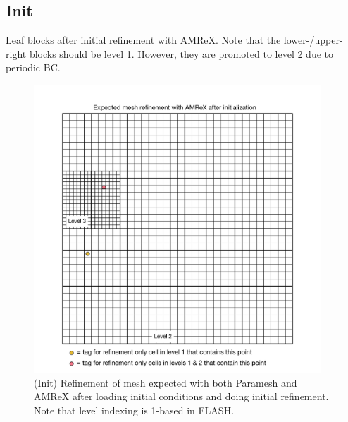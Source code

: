 \documentclass[12pt,letterpaper]{article}
\begin{document}
\newpage
\subsection{Init}
Leaf blocks after initial refinement with AMReX.  Note that the
lower-/upper-right blocks should be level 1.  However, they are promoted to
level 2 due to periodic BC.
\begin{figure}[!hp]
\begin{center}
\includegraphics[width=4.25in]{TestRefine_Init_Both.pdf}
\caption{(Init) Refinement of mesh expected with both Paramesh and AMReX after loading
initial conditions and doing initial refinement.  Note that level indexing is
1-based in FLASH.}
\end{center}
\end{figure}

\newpage
\end{document}
